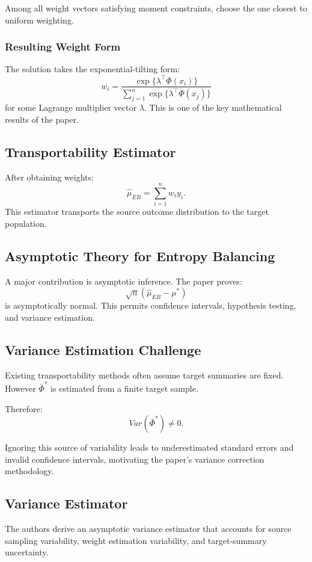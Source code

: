 \documentclass[11pt]{article}
\begin{document}
Among all weight vectors satisfying moment constraints, choose the one closest to uniform weighting.

\subsubsection*{Resulting Weight Form}

The solution takes the exponential-tilting form:\[w_i=\frac{\exp\{\lambda^\top \Phi(x_i)\}}{\sum_{j=1}^{n}\exp\{\lambda^\top \Phi(x_j)\}}\] for some Lagrange multiplier vector \(\lambda\). This is one of the key mathematical results of the paper.

\subsection*{Transportability Estimator}

After obtaining weights:\[\hat{\mu}_{EB}=\sum_{i=1}^{n}w_i y_i.\] This estimator transports the source outcome distribution to the target population.

\subsection*{Asymptotic Theory for Entropy Balancing}

A major contribution is asymptotic inference. The paper proves: \[\sqrt{n}(\hat{\mu}_{EB}-\mu^*)\] is asymptotically normal. This permits confidence intervals, hypothesis testing, and variance estimation.

\subsection*{Variance Estimation Challenge}

Existing transportability methods often assume target summaries are fixed. However $\bar{\Phi}^*$ is estimated from a finite target sample.

Therefore:\[Var(\bar{\Phi}^*)\neq 0.\]

Ignoring this source of variability leads to underestimated standard errors and invalid confidence intervals, motivating the paper's variance correction methodology.

\subsection*{Variance Estimator}

The authors derive an asymptotic variance estimator that accounts for source sampling variability, weight estimation variability, and target-summary uncertainty.
\end{document}
